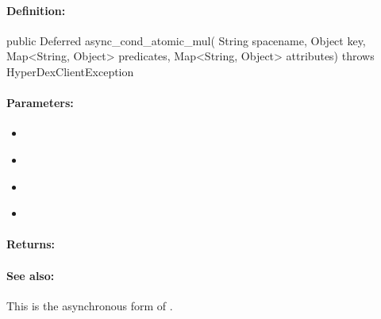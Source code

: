 \paragraph{Definition:}
\begin{javacode}
public Deferred async_cond_atomic_mul(
        String spacename,
        Object key,
        Map<String, Object> predicates,
        Map<String, Object> attributes) throws HyperDexClientException
\end{javacode}

\paragraph{Parameters:}
\begin{itemize}[noitemsep]
\item {}\\

\item {}\\

\item {}\\

\item {}\\

\end{itemize}

\paragraph{Returns:}


\paragraph{See also:}  This is the asynchronous form of .

\pagebreak
\subsubsection{}
\label{api:java:group_atomic_div}


